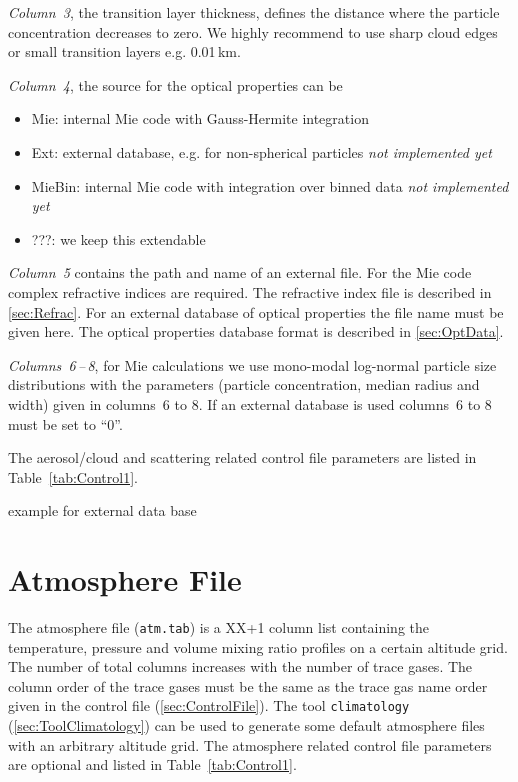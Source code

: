 \emph{Column~3}, the transition layer thickness, defines the distance where the particle concentration decreases to zero. We highly recommend to use sharp cloud edges or small transition layers e.g. 0.01\,km.

\emph{Column~4}, the source for the optical properties can be
\begin{itemize}
\item Mie: internal Mie code with Gauss-Hermite integration
\item Ext: external database, e.g. for non-spherical particles \emph{not implemented yet}
\item MieBin: internal Mie code with integration over binned data \emph{not implemented yet}
\item ???: we keep this extendable
\end{itemize}

\emph{Column~5} contains the path and name of an external file. For the Mie code complex refractive indices are required. The refractive index file is described in \ref{sec:Refrac}. For an external database of optical properties the file name must be given here. The optical properties database format is described in \ref{sec:OptData}.

\emph{Columns~6\,--\,8}, for Mie calculations we use mono-modal log-normal particle size distributions with the parameters (particle concentration, median radius and width) given in columns~6 to 8. If an external database is used columns~6 to 8 must be set to ``0''. %

The aerosol/cloud and scattering related control file parameters are listed in Table~\ref{tab:Control1}.

\todo example for external data base\\


\section{Atmosphere File}
The atmosphere file (\texttt{atm.tab}) is a XX+1 column list containing the temperature, pressure and volume mixing ratio profiles on a certain altitude grid. The number of total columns increases with the number of trace gases. The column order of the trace gases must be the same as the trace gas name order given in the control file (\ref{sec:ControlFile}). The tool \texttt{climatology} (\ref{sec:ToolClimatology}) can be used to generate some default atmosphere files with an arbitrary altitude grid. The atmosphere related control file parameters are optional and listed in Table~\ref{tab:Control1}.

